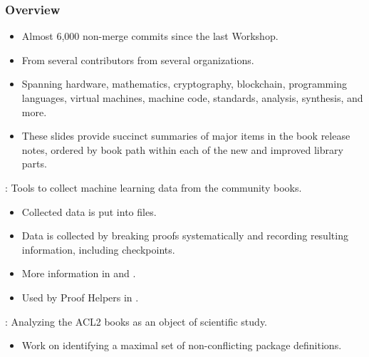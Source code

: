 


\begin{frame}

\frametitle{Overview}

\begin{itemize}
\item Almost 6,000 non-merge commits since the last Workshop.
\item From several contributors from several organizations.
\item Spanning hardware, mathematics, cryptography, blockchain,
      programming languages, virtual machines, machine code,
      standards, analysis, synthesis, and more.
\item These slides provide succinct summaries
      of major items in the book release notes,
      ordered by book path within each of the new and improved library parts.
\end{itemize}

\end{frame}


\begin{frame}

\newlibtitle

:
Tools to collect machine learning data from the community books.
\begin{itemize}
\item Collected data is put into  files.
\item Data is collected by breaking proofs systematically
      and recording resulting information, including checkpoints.
\item More information in  and  .
\item Used by Proof Helpers in .
\end{itemize}

\end{frame}


\begin{frame}

\newlibtitle

:
Analyzing the ACL2 books as an object of scientific study.
\begin{itemize}
\item Work on identifying a maximal set of non-conflicting package definitions.
\end{itemize}

\end{frame}

